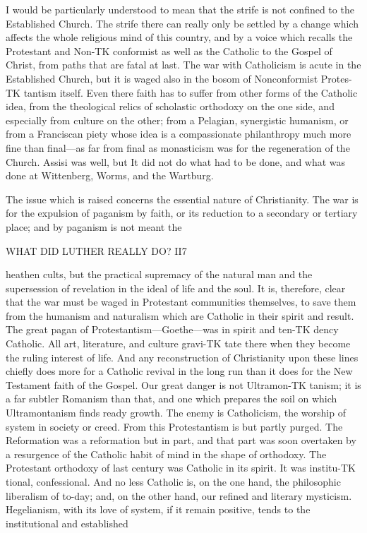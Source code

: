 \documentclass[12pt,a5paper,oneside]{book}
\begin{document}
I would be particularly understood to mean that 
the strife is not confined to the Established Church. 
The strife there can really only be settled by a change 
which affects the whole religious mind of this country, 
and by a voice which recalls the Protestant and Non-TK
conformist as well as the Catholic to the Gospel of 
Christ, from paths that are fatal at last. The war with 
Catholicism is acute in the Established Church, but it 
is waged also in the bosom of Nonconformist Protes-TK
tantism itself. Even there faith has to suffer from 
other forms of the Catholic idea, from the theological 
relics of scholastic orthodoxy on the one side, and 
especially from culture on the other; from a Pelagian, 
synergistic humanism, or from a Franciscan piety whose 
idea is a compassionate philanthropy much more fine 
than final---as far from final as monasticism was for 
the regeneration of the Church. Assisi was well, but 
It did not do what had to be done, and what was 
done at Wittenberg, Worms, and the Wartburg. 

The issue which is raised concerns the essential 
nature of Christianity. The war is for the expulsion 
of paganism by faith, or its reduction to a secondary or 
tertiary place; and by paganism is not meant the 



WHAT DID LUTHER REALLY DO? II7 

heathen cults, but the practical supremacy of the natural 
man and the supersession of revelation in the ideal of 
life and the soul. It is, therefore, clear that the war 
must be waged in Protestant communities themselves, 
to save them from the humanism and naturalism which 
are Catholic in their spirit and result. The great pagan 
of Protestantism---Goethe---was in spirit and ten-TK
dency Catholic. All art, literature, and culture gravi-TK
tate there when they become the ruling interest of life. 
And any reconstruction of Christianity upon these 
lines chiefly does more for a Catholic revival in the 
long run than it does for the New Testament faith 
of the Gospel. Our great danger is not Ultramon-TK
tanism; it is a far subtler Romanism than that, and 
one which prepares the soil on which Ultramontanism 
finds ready growth. The enemy is Catholicism, 
the worship of system in society or creed. From this 
Protestantism is but partly purged. The Reformation 
was a reformation but in part, and that part was soon 
overtaken by a resurgence of the Catholic habit of mind 
in the shape of orthodoxy. The Protestant orthodoxy 
of last century was Catholic in its spirit. It was institu-TK
tional, confessional. And no less Catholic is, on the 
one hand, the philosophic liberalism of to-day; and, 
on the other hand, our refined and literary mysticism. 
Hegelianism, with its love of system, if it remain 
positive, tends to the institutional and established 
\end{document}

